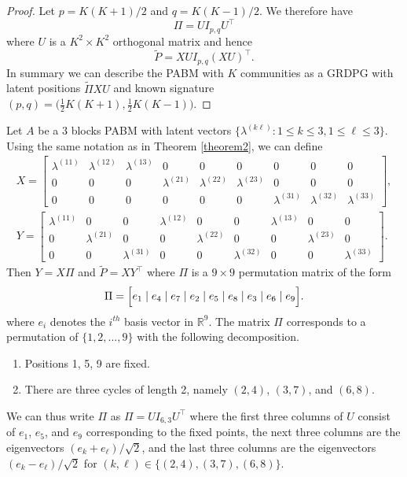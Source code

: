 \documentclass[12pt]{article}
\begin{document}
\begin{proof}
Let $p = K (K + 1) / 2$ and $q = K (K - 1) / 2$. 
We therefore have
\begin{equation} \label{eq:permutation}
\Pi = U I_{p,q} U^\top
\end{equation}
where $U$ is a $K^2 \times K^2$ orthogonal matrix and hence
\begin{equation} \label{eq:pabm-grdpg}
\tilde{P} = X U I_{p, q} (X U)^\top.
\end{equation}
In summary we can describe the PABM with $K$ communities as a GRDPG with latent
positions $\tilde{\Pi} X U$ and known signature $(p,q) = \bigl( \tfrac{1}{2} K (K + 1) ,
\tfrac{1}{2} K (K - 1)\bigr)$.
\end{proof}

\begin{example} Let $A$ be a $3$ blocks PABM with latent vectors
  $\{\lambda^{(k \ell)} \colon 1 \leq k \leq 3, 1 \leq \ell \leq 3\}$. Using the same notation as in Theorem
  \ref{theorem2}, we can define
\begin{gather*}
X = \begin{bmatrix}
\lambda^{(11)} & \lambda^{(12)} & \lambda^{(13)} & 0 & 0 & 0 & 0 & 0 & 0 \\
0 & 0 & 0 & \lambda^{(21)} & \lambda^{(22)} & \lambda^{(23)} & 0 & 0 & 0 \\
0 & 0 & 0 & 0 & 0 & 0 & \lambda^{(31)} & \lambda^{(32)} & \lambda^{(33)}
\end{bmatrix}, \\
Y = \begin{bmatrix}
\lambda^{(11)} & 0 & 0 & \lambda^{(12)} & 0 & 0 & \lambda^{(13)} & 0 & 0 \\
0 & \lambda^{(21)} & 0 & 0 & \lambda^{(22)} & 0 & 0 & \lambda^{(23)} & 0 \\
0 & 0 & \lambda^{(31)} & 0 & 0 & \lambda^{(32)} & 0 & 0 & \lambda^{(33)}
\end{bmatrix}.
\end{gather*}
Then $Y = X \Pi$ and $\tilde{P} = X Y^{\top}$ where $\Pi$ is a $9 \times 9$ 
permutation matrix of the form
$$\Pi = 
\Bigl[e_1 \mid e_4 \mid e_7 \mid e_2 \mid e_5 \mid e_8 \mid e_3
\mid e_6 \mid e_9 \Bigr].$$
where $e_i$ denotes the $i^{th}$ basis vector in $\mathbb{R}^{9}$. 
The matrix $\Pi$ corresponds to a permutation of $\{1,2,\dots,9\}$
with the following decomposition.
\begin{enumerate}
\item Positions 1, 5, 9 are fixed.
\item There are three cycles of length 2, namely $(2, 4)$, $(3, 7)$, and $(6, 8)$.
\end{enumerate}
We can thus write $\Pi$ as $\Pi = U I_{6, 3} U^\top$ where the first three
columns of $U$ consist of $e_1$, $e_5$, and $e_9$ corresponding to the
fixed points, the next three columns are the eigenvectors
$(e_k + e_{\ell}) / \sqrt{2}$, and the last three columns are the eigenvectors
$(e_k - e_{\ell}) / \sqrt{2}$ for $(k, \ell) \in
\{(2,4),(3,7),(6,8)\}$.


\end{example}
\end{document}
